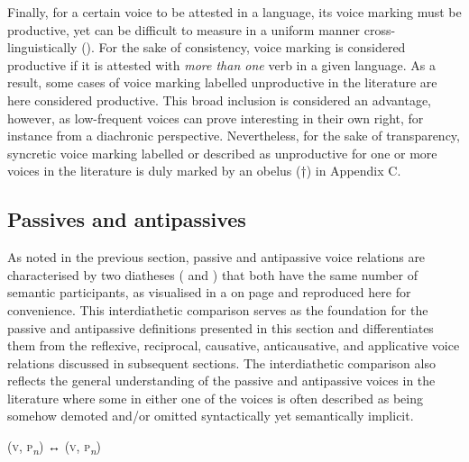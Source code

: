 Finally, for a certain voice to be attested in a language, its voice marking must be productive, yet  can be difficult to measure in a uniform manner cross-linguistically (). For the sake of consistency, voice marking is considered productive if it is attested with \textit{more than one} verb in a given language. As a result, some cases of voice marking labelled unproductive in the literature are here considered productive. This broad inclusion is considered an advantage, however, as low-frequent voices can prove interesting in their own right, for instance from a diachronic perspective. Nevertheless, for the sake of transparency, syncretic voice marking labelled or described as unproductive for one or more voices in the literature is duly marked by an obelus (†) in Appendix C.

\subsection{Passives and antipassives} \label{def:passives-antipassives}
As noted in the previous section, passive and antipassive voice relations are characterised by two diatheses ( and ) that both have the same number of semantic participants, as visualised in a on page \pageref{fig:ch2:diathetic-relations} and reproduced here for convenience. This interdiathetic comparison serves as the foundation for the passive and antipassive definitions presented in this section and differentiates them from the reflexive, reciprocal, causative, anticausative, and applicative voice relations discussed in subsequent sections. The interdiathetic comparison also reflects the general understanding of the passive and antipassive voices in the literature where some  in either one of the voices is often described as being somehow demoted and/or omitted syntactically yet semantically implicit.

\ea
	 (\textsc{v}, \textsc{p}\textsubscript{\textit{n}}) ↔  (\textsc{v}, \textsc{p}\textsubscript{\textit{n}})
\z

